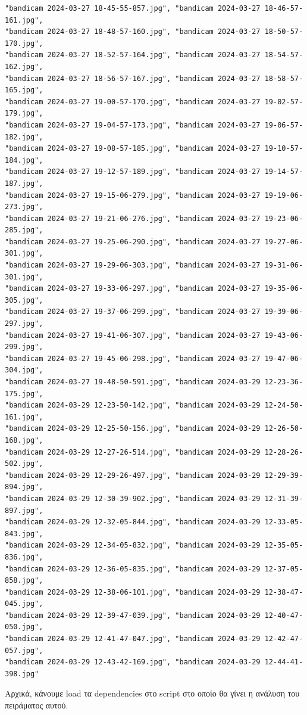 \documentclass[11pt]{article}
\begin{document}
\begin{verbatim}
"bandicam 2024-03-27 18-45-55-857.jpg", "bandicam 2024-03-27 18-46-57-161.jpg",
"bandicam 2024-03-27 18-48-57-160.jpg", "bandicam 2024-03-27 18-50-57-170.jpg",
"bandicam 2024-03-27 18-52-57-164.jpg", "bandicam 2024-03-27 18-54-57-162.jpg",
"bandicam 2024-03-27 18-56-57-167.jpg", "bandicam 2024-03-27 18-58-57-165.jpg",
"bandicam 2024-03-27 19-00-57-170.jpg", "bandicam 2024-03-27 19-02-57-179.jpg",
"bandicam 2024-03-27 19-04-57-173.jpg", "bandicam 2024-03-27 19-06-57-182.jpg",
"bandicam 2024-03-27 19-08-57-185.jpg", "bandicam 2024-03-27 19-10-57-184.jpg",
"bandicam 2024-03-27 19-12-57-189.jpg", "bandicam 2024-03-27 19-14-57-187.jpg",
"bandicam 2024-03-27 19-15-06-279.jpg", "bandicam 2024-03-27 19-19-06-273.jpg",
"bandicam 2024-03-27 19-21-06-276.jpg", "bandicam 2024-03-27 19-23-06-285.jpg",
"bandicam 2024-03-27 19-25-06-290.jpg", "bandicam 2024-03-27 19-27-06-301.jpg",
"bandicam 2024-03-27 19-29-06-303.jpg", "bandicam 2024-03-27 19-31-06-301.jpg",
"bandicam 2024-03-27 19-33-06-297.jpg", "bandicam 2024-03-27 19-35-06-305.jpg",
"bandicam 2024-03-27 19-37-06-299.jpg", "bandicam 2024-03-27 19-39-06-297.jpg",
"bandicam 2024-03-27 19-41-06-307.jpg", "bandicam 2024-03-27 19-43-06-299.jpg",
"bandicam 2024-03-27 19-45-06-298.jpg", "bandicam 2024-03-27 19-47-06-304.jpg",
"bandicam 2024-03-27 19-48-50-591.jpg", "bandicam 2024-03-29 12-23-36-175.jpg",
"bandicam 2024-03-29 12-23-50-142.jpg", "bandicam 2024-03-29 12-24-50-161.jpg",
"bandicam 2024-03-29 12-25-50-156.jpg", "bandicam 2024-03-29 12-26-50-168.jpg",
"bandicam 2024-03-29 12-27-26-514.jpg", "bandicam 2024-03-29 12-28-26-502.jpg",
"bandicam 2024-03-29 12-29-26-497.jpg", "bandicam 2024-03-29 12-29-39-894.jpg",
"bandicam 2024-03-29 12-30-39-902.jpg", "bandicam 2024-03-29 12-31-39-897.jpg",
"bandicam 2024-03-29 12-32-05-844.jpg", "bandicam 2024-03-29 12-33-05-843.jpg",
"bandicam 2024-03-29 12-34-05-832.jpg", "bandicam 2024-03-29 12-35-05-836.jpg",
"bandicam 2024-03-29 12-36-05-835.jpg", "bandicam 2024-03-29 12-37-05-858.jpg",
"bandicam 2024-03-29 12-38-06-101.jpg", "bandicam 2024-03-29 12-38-47-045.jpg",
"bandicam 2024-03-29 12-39-47-039.jpg", "bandicam 2024-03-29 12-40-47-050.jpg",
"bandicam 2024-03-29 12-41-47-047.jpg", "bandicam 2024-03-29 12-42-47-057.jpg",
"bandicam 2024-03-29 12-43-42-169.jpg", "bandicam 2024-03-29 12-44-41-398.jpg"
\end{verbatim}

Αρχικά, κάνουμε load τα dependencies στο script στο οποίο θα γίνει η ανάλυση του πειράματος αυτού.
\end{document}
